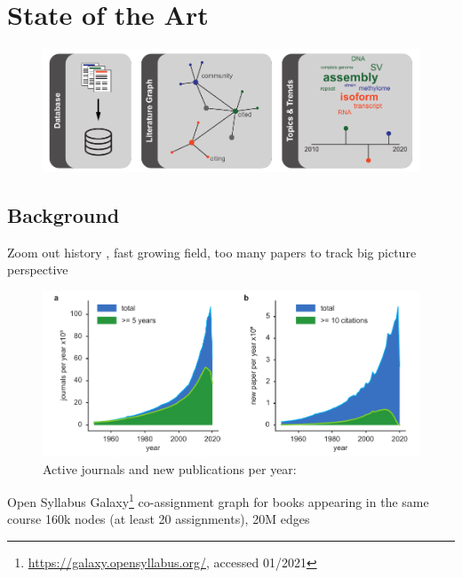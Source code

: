\chapter{State of the Art}
\label{cha:state_of_art}



\begin{figure}[h]
	\centering
	\includegraphics[width=1.0\textwidth]{figures/state_of_art/GA.pdf}
	\label{fig:state_of_art:ga}
\end{figure}




\section{Background}
\label{sec:state_of_art:background}

Zoom out history \cite{Deamer2016}, fast growing field, too many papers to track big picture perspective

\begin{figure}[h]
	\centering
	\includegraphics[width=1.0\textwidth]{figures/state_of_art/paper_count.pdf}
	\captionsetup{format=plain}
	\caption[Journals and publications per year]{Active journals and new publications per year:}
	\label{fig:state_of_art:paper_count}
\end{figure}


Open Syllabus Galaxy\footnote{\url{https://galaxy.opensyllabus.org/}, accessed 01/2021}
co-assignment graph for books appearing in the same course
160k nodes (at least 20 assignments), 20M edges




